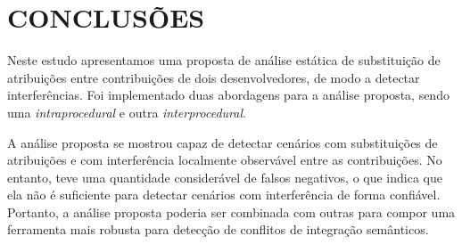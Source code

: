 \section{CONCLUSÕES}

Neste estudo apresentamos uma proposta de análise estática de substituição de atribuições entre contribuições de dois desenvolvedores, de modo a detectar interferências. Foi implementado duas abordagens para a análise proposta, sendo uma \emph{intraprocedural} e outra \emph{interprocedural}.


A análise proposta se mostrou capaz de detectar cenários com substituições de atribuições e com interferência localmente observável entre as contribuições. No entanto, teve uma quantidade considerável de falsos negativos, o que indica que ela não é suficiente para detectar cenários com interferência de forma confiável. Portanto, a análise proposta poderia ser combinada com outras para compor uma ferramenta mais robusta para detecção de conflitos de integração semânticos.

